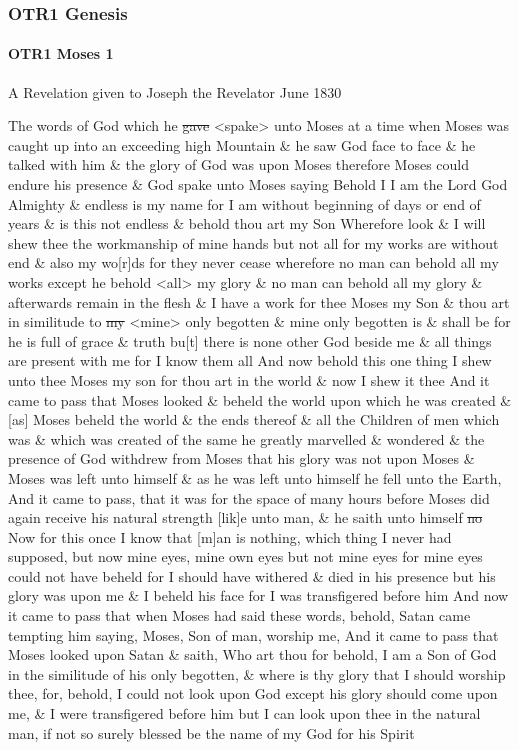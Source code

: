 \label{JST-OTR1}

\subsubsection{OTR1 Genesis}
	\label{JST-OTR1-GENESIS}
	
	\paragraph{OTR1 Moses 1}
		\label{JST-OTR1-MOSES-1}
		
		A Revelation given to Joseph the Revelator June 1830
		
		The words of God which he \sout{gave} <spake> unto Moses at a time when Moses was caught up into an exceeding high Mountain \& he saw God face to face \& he talked with him \& the glory of God was upon Moses therefore Moses could endure his presence \& God spake unto Moses saying Behold I I am the Lord God Almighty \& endless is my name for I am without beginning of days or end of years \& is this not endless \& behold thou art my Son Wherefore look \& I will shew thee the workmanship of mine hands but not all for my works are without end \& also my wo[r]ds for they never cease wherefore no man can behold all my works except he behold <all> my glory \& no man can behold all my glory \& afterwards remain in the flesh \& I have a work for thee Moses my Son \& thou art in similitude to \sout{my} <mine> only begotten \& mine only begotten is \& shall be for he is full of grace \& truth bu[t] there is none other God beside me \& all things are present with me for I know them all And now behold this one thing I shew unto thee Moses my son for thou art in the world \& now I shew it thee And it came to pass that Moses looked \& beheld the world upon which he was created \& [as] Moses beheld the world \& the ends thereof \& all the Children of men which was \& which was created of the same he greatly marvelled \& wondered \& the presence of God withdrew from Moses that his glory was not upon Moses \& Moses was left unto himself \& as he was left unto himself he fell unto the Earth, And it came to pass, that it was for the space of many hours before Moses did again receive his natural strength [lik]e unto man, \& he saith unto himself \sout{no} Now for this once I know that [m]an is nothing, which thing I never had supposed, but now mine eyes, mine own eyes but not mine eyes for mine eyes could not have beheld for I should have withered \& died in his presence but his glory was upon me \& I beheld his face for I was transfigered before him And now it came to pass that when Moses had said these words, behold, Satan came tempting him saying, Moses, Son of man, worship me, And it came to pass that Moses looked upon Satan \& saith, Who art thou for behold, I am a Son of God in the similitude of his only begotten, \& where is thy glory that I should worship thee, for, behold, I could not look upon God except his glory should come upon me, \& I were transfigered before him but I can look upon thee in the natural man, if not so surely blessed be the name of my God for his Spirit 